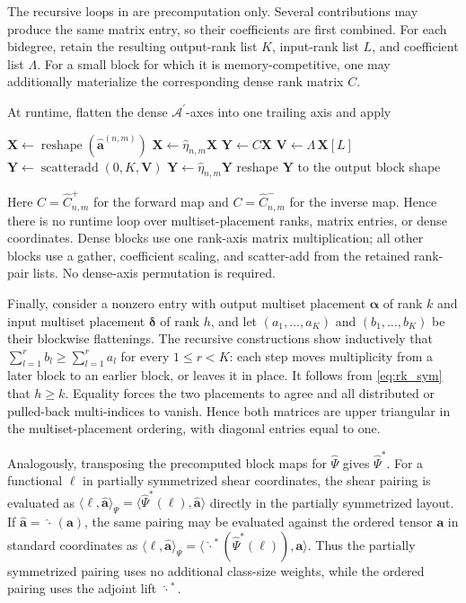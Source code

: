 \documentclass{amsart}
\theoremstyle{definition}
\theoremstyle{remark}
\newcommand{\symmetrizer}{{\,\widehat{\cdot}\,}}
\begin{document}
\begin{implrmk}
The recursive loops in
 are precomputation only. Several
contributions may produce the same matrix entry, so their coefficients are
first combined. For each bidegree, retain the resulting output-rank list
$K$, input-rank list $L$, and coefficient list $\Lambda$. For a small block
for which it is memory-competitive, one may additionally materialize the
corresponding dense rank matrix $C$.

At runtime, flatten the dense
$\mathcal{A}^{\prime}$-axes into one trailing axis and apply
\begin{algorithmic}[1]
\State $\mathbf{X}\gets
    \operatorname{reshape}
    (\widehat{\mathbf{a}}^{(n,m)})$
    \State $\mathbf{X}\gets\widehat{\eta}_{n,m}\mathbf{X}$
\EndIf
{}
    \State $\mathbf{Y}\gets C\mathbf{X}$
\Else
    \State $\mathbf{V}\gets\Lambda\,\mathbf{X}[L]$
    \State $\mathbf{Y}\gets
        \operatorname{scatteradd}(0,K,\mathbf{V})$
\EndIf
{}
    \State $\mathbf{Y}\gets\widehat{\eta}_{n,m}\mathbf{Y}$
\EndIf
\State reshape $\mathbf{Y}$ to the output block shape
\end{algorithmic}
Here $C=\widehat{C}^{+}_{n,m}$ for the forward map and
$C=\widehat{C}^{-}_{n,m}$ for the inverse map.
Hence there is no runtime loop over multiset-placement ranks, matrix
entries, or dense coordinates. Dense blocks use one rank-axis matrix
multiplication; all other blocks use a gather, coefficient scaling, and
scatter-add from the retained rank-pair lists. No dense-axis permutation is
required.
\end{implrmk}

Finally, consider a nonzero entry with output multiset placement
$\boldsymbol{\alpha}$ of rank $k$ and input multiset placement
$\boldsymbol{\delta}$ of rank $h$, and let $(a_1,\ldots,a_K)$ and
$(b_1,\ldots,b_K)$ be their blockwise flattenings. The recursive
constructions show inductively that
$\sum_{l=1}^r b_l\geq\sum_{l=1}^r a_l$ for every $1\leq r<K$: each step
moves multiplicity from a later block to an earlier block, or leaves it in
place. It follows from \eqref{eq:rk_sym} that $h\geq k$. Equality forces the
two placements to agree and all distributed or pulled-back multi-indices to
vanish. Hence both matrices are upper triangular in the multiset-placement
ordering, with diagonal entries equal to one.

Analogously, transposing the precomputed block maps for $\widehat{\Psi}$
gives $\widehat{\Psi}^{\ast}$. For a functional $\ell$ in partially
symmetrized shear coordinates, the shear pairing is evaluated as
$\langle\ell,\widehat{\mathbf{a}}\rangle_{\Psi}
=\langle\widehat{\Psi}^{\ast}(\ell),
\widehat{\mathbf{a}}\rangle$ directly in the partially symmetrized layout.
If $\widehat{\mathbf{a}}=\symmetrizer(\mathbf{a})$, the same pairing may be
evaluated against the ordered tensor $\mathbf{a}$ in standard coordinates as
$\langle\ell,\widehat{\mathbf{a}}\rangle_{\Psi}
=\langle\symmetrizer^{\ast}(\widehat{\Psi}^{\ast}(\ell)),
\mathbf{a}\rangle$. Thus the partially symmetrized pairing uses no additional
class-size weights, while the ordered pairing uses the adjoint lift
$\symmetrizer^{\ast}$.
\end{document}
